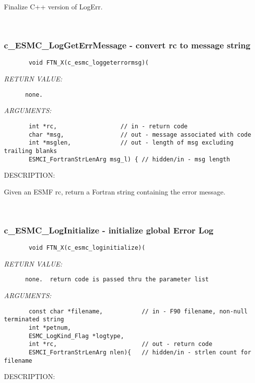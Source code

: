        Finalize C++ version of LogErr.
   
 
\mbox{}\hrulefill\ 
 
\subsubsection [c\_ESMC\_LogGetErrMessage] {c\_ESMC\_LogGetErrMessage - convert rc to message string}


  
\begin{verbatim}       void FTN_X(c_esmc_loggeterrormsg)(\end{verbatim}{\em RETURN VALUE:}
\begin{verbatim}      none.\end{verbatim}{\em ARGUMENTS:}
\begin{verbatim} 
       int *rc,                  // in - return code
       char *msg,                // out - message associated with code
       int *msglen,              // out - length of msg excluding trailing blanks
       ESMCI_FortranStrLenArg msg_l) { // hidden/in - msg length\end{verbatim}
{\sf DESCRIPTION:\\ }


       Given an ESMF rc, return a Fortran string containing the error message.
   
 
\mbox{}\hrulefill\ 
 
\subsubsection [c\_ESMC\_LogInitialize] {c\_ESMC\_LogInitialize - initialize global Error Log}


  
\begin{verbatim}       void FTN_X(c_esmc_loginitialize)(\end{verbatim}{\em RETURN VALUE:}
\begin{verbatim}      none.  return code is passed thru the parameter list\end{verbatim}{\em ARGUMENTS:}
\begin{verbatim}       const char *filename,           // in - F90 filename, non-null terminated string
       int *petnum,
       ESMC_LogKind_Flag *logtype,
       int *rc,                        // out - return code
       ESMCI_FortranStrLenArg nlen){   // hidden/in - strlen count for filename\end{verbatim}
{\sf DESCRIPTION:\\ }


